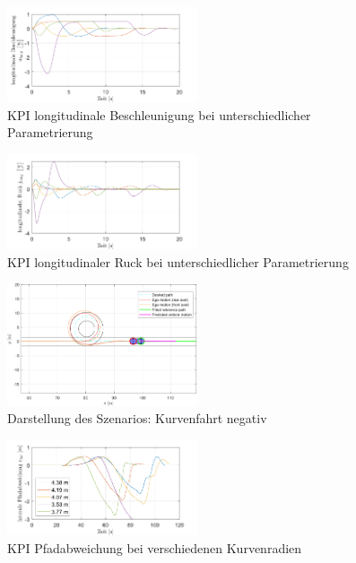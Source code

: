 \begin{figure}
    \centering
    \includegraphics[width=0.5\textwidth]{figures/3_Implementierung/ACC_Vel_Const/ACC_Vel_Const_a-Long.pdf}
    \caption{KPI longitudinale Beschleunigung bei unterschiedlicher Parametrierung}
    \label{fig:ACC_Vel_Const_a-Long}
\end{figure}


\begin{figure}
    \centering
    \includegraphics[width=0.5\textwidth]{figures/3_Implementierung/ACC_Vel_Const/ACC_Vel_Const_j-Long.pdf}
    \caption{KPI longitudinaler Ruck bei unterschiedlicher Parametrierung}
    \label{fig:ACC_Vel_Const_j-Long}
\end{figure}

\begin{figure}
    \centering
    \includegraphics[width=0.5\textwidth]{figures/3_Implementierung/Curve_negative/test_curve_negative_depiction.pdf}
    \caption{Darstellung des Szenarios: Kurvenfahrt negativ}
    \label{fig:test_curve_negative_depiction}
\end{figure}


\begin{figure}
    \centering
    \includegraphics[width=0.5\textwidth]{figures/3_Implementierung/Curve_negative/Curve_negative_s-Error.pdf}
    \caption{KPI Pfadabweichung bei verschiedenen Kurvenradien}
    \label{fig:Curve_negative_s-Error}
\end{figure}